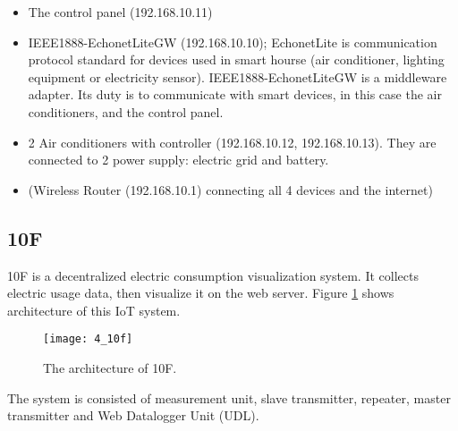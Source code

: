 \begin{itemize}[itemsep=0mm]
    \item The control panel (192.168.10.11)
    \item IEEE1888-EchonetLiteGW (192.168.10.10); 
    EchonetLite is communication protocol standard for devices used in smart hourse (air conditioner, lighting equipment or electricity sensor).
    IEEE1888-EchonetLiteGW is a middleware adapter. Its duty is to communicate with smart devices, in this case the air conditioners, and the control panel.
    \item 2 Air conditioners with controller (192.168.10.12, 192.168.10.13). 
    They are connected to 2 power supply: electric grid and battery.
    \item (Wireless Router (192.168.10.1) connecting all 4 devices and the internet)
\end{itemize}


\subsection{10F}

10F is a decentralized electric consumption visualization system. It collects electric usage data, 
then visualize it on the web server. Figure \ref{fig:s4_10f} shows architecture of this IoT system. 

\begin{figure}[H]
    \centering 
    \texttt{[image: 4\_10f]}
    \caption{\small The architecture of 10F.}
    \label{fig:s4_10f}
\end{figure} 



The system is consisted of measurement unit, slave transmitter, repeater, master transmitter and Web Datalogger Unit (UDL).  

